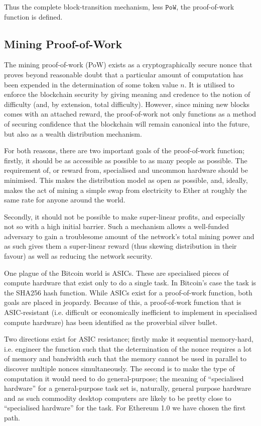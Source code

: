 \documentclass[9pt,oneside]{amsart}
\begin{document}
\begin{multicols}{2}
Thus the complete block-transition mechanism, less $\mathtt{PoW}$, the proof-of-work function is defined.

\subsection{Mining Proof-of-Work} \label{ch:pow}

The mining proof-of-work (PoW) exists as a cryptographically secure nonce that proves beyond reasonable doubt that a particular amount of computation has been expended in the determination of some token value $n$. It is utilised to enforce the blockchain security by giving meaning and credence to the notion of difficulty (and, by extension, total difficulty). However, since mining new blocks comes with an attached reward, the proof-of-work not only functions as a method of securing confidence that the blockchain will remain canonical into the future, but also as a wealth distribution mechanism.

For both reasons, there are two important goals of the proof-of-work function; firstly, it should be as accessible as possible to as many people as possible. The requirement of, or reward from, specialised and uncommon hardware should be minimised. This makes the distribution model as open as possible, and, ideally, makes the act of mining a simple swap from electricity to Ether at roughly the same rate for anyone around the world.

Secondly, it should not be possible to make super-linear profits, and especially not so with a high initial barrier. Such a mechanism allows a well-funded adversary to gain a troublesome amount of the network's total mining power and as such gives them a super-linear reward (thus skewing distribution in their favour) as well as reducing the network security.

One plague of the Bitcoin world is ASICs. These are specialised pieces of compute hardware that exist only to do a single task. In Bitcoin's case the task is the SHA256 hash function. While ASICs exist for a proof-of-work function, both goals are placed in jeopardy. Because of this, a proof-of-work function that is ASIC-resistant (i.e. difficult or economically inefficient to implement in specialised compute hardware) has been identified as the proverbial silver bullet.

Two directions exist for ASIC resistance; firstly make it sequential memory-hard, i.e. engineer the function such that the determination of the nonce requires a lot of memory and bandwidth such that the memory cannot be used in parallel to discover multiple nonces simultaneously. The second is to make the type of computation it would need to do general-purpose; the meaning of ``specialised hardware''  for a general-purpose task set is, naturally, general purpose hardware and as such commodity desktop computers are likely to be pretty close to ``specialised hardware'' for the task. For Ethereum 1.0 we have chosen the first path.


\end{multicols}
\end{document}
